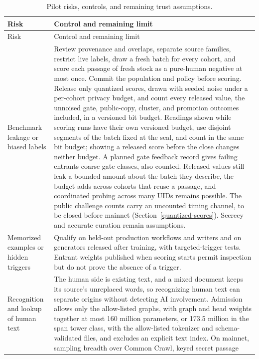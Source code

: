 \begin{longtable}{@{}>{\raggedright\arraybackslash}p{}>{\raggedright\arraybackslash}p{}@{}}
\caption{Pilot risks, controls, and remaining trust assumptions.}\label{tab:pilot-risks}\\
\toprule
Risk & Control and remaining limit \\
\midrule
\endfirsthead
\toprule
Risk & Control and remaining limit \\
\midrule
\endhead
\bottomrule
\endfoot
Benchmark leakage or biased labels & Review provenance and overlaps, separate
source families, restrict live labels, draw a fresh batch for every cohort,
and score each passage of fresh stock as a pure-human negative at most once. Commit the
population and policy before scoring. Release only quantized scores, drawn with
seeded noise under a per-cohort privacy budget, and count every released value,
the unnoised gate, public-copy, cluster, and promotion outcomes included, in a
versioned bit budget. Readings shown while scoring runs have their own
versioned budget, use disjoint segments of the batch fixed at the seal, and
count in the same bit budget; showing a released score before the close
changes neither budget. A planned gate feedback record gives failing entrants
coarse gate classes, also counted. Released values still leak a bounded amount
about the batch they describe, the budget adds across cohorts that reuse a
passage, and coordinated probing across many UIDs remains possible. The public
challenge counts carry an uncounted timing channel, to be closed before
mainnet (Section~\ref{quantized-scores}). Secrecy and accurate curation remain
assumptions. \\
Memorized examples or hidden triggers & Qualify on held-out production workflows
and writers and on generators released after training, with targeted-trigger tests. Entrant weights published
when scoring starts permit inspection but do not prove the absence of a trigger. \\
Recognition and lookup of human text & The human side is existing text, and a
mixed document keeps its source's unreplaced words, so recognizing human text
can separate origins without detecting AI involvement. Admission allows only
the allow-listed graphs, with graph and head weights together at most
160 million parameters, or 173.5 million in the span tower class, with the
allow-listed tokenizer and schema-validated files, and excludes an explicit
text index. On mainnet, sampling breadth over Common Crawl, keyed secret passage

\end{longtable}
